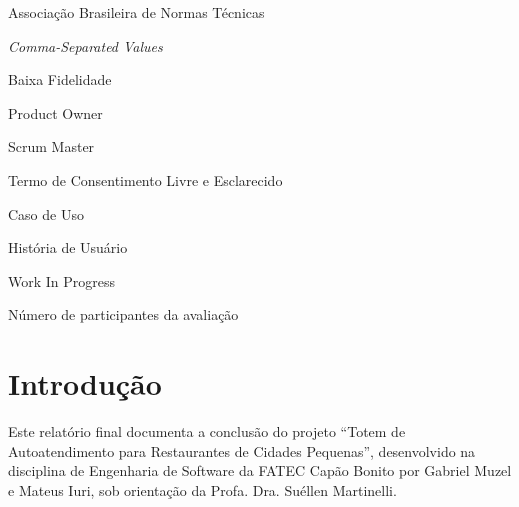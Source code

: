 \documentclass[12pt, oneside, a4paper, chapter=TITLE,section=TITLE]{abntex2}
\begin{document}
\frenchspacing

\pretextual
\imprimircapa %
\imprimirfolhaderosto %

 \listoffigures*
\cleardoublepage

\listoftables*
\cleardoublepage

 \listofquadros*
\cleardoublepage

\begin{siglas}
  \item[ABNT] Associação Brasileira de Normas Técnicas
  \item[CSV] \textit{Comma-Separated Values}
  \item[LF] Baixa Fidelidade
    \item[PO] Product Owner
  \item[SM] Scrum Master
  \item[TCLE] Termo de Consentimento Livre e Esclarecido
  \item[UC] Caso de Uso
  \item[US] História de Usuário
  \item[WIP] Work In Progress
\end{siglas}

\begin{simbolos}
  \item[$N$] Número de participantes da avaliação
\end{simbolos}

\tableofcontents*

\textual

\chapter{Introdução}

Este relatório final documenta a conclusão do projeto ``Totem de Autoatendimento para Restaurantes de Cidades Pequenas'', desenvolvido na disciplina de Engenharia de Software da FATEC Capão Bonito por Gabriel Muzel e Mateus Iuri, sob orientação da Profa. Dra. Suéllen Martinelli.
\end{document}
